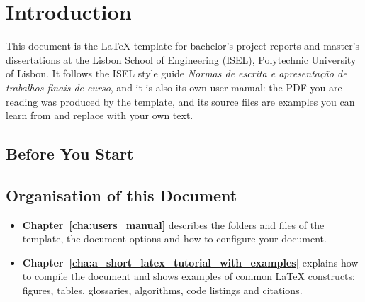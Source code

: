 % 
%  
%
\chapter{Introduction}
\label{cha:introduction}

This document is the \LaTeX{} template for bachelor's project reports and master's dissertations at the Lisbon School of Engineering (ISEL), Polytechnic University of Lisbon. It follows the ISEL style guide \emph{Normas de escrita e apresentação de trabalhos finais de curso}, and it is also its own user manual: the PDF you are reading was produced by the template, and its source files are examples you can learn from and replace with your own text.

\section{Before You Start}
\label{sec:before_you_start}

\noindent%

\section{Organisation of this Document}
\label{sec:organisation}

\begin{itemize}
	\item \textbf{Chapter~\ref{cha:users_manual}} describes the folders and files of the template, the document options and how to configure your document.
	\item \textbf{Chapter~\ref{cha:a_short_latex_tutorial_with_examples}} explains how to compile the document and shows examples of common \LaTeX{} constructs: figures, tables, glossaries, algorithms, code listings and citations.
\end{itemize}

